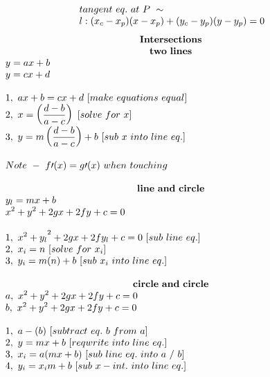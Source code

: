 \documentclass{article}
\begin{document}
\begin{multicols}{2}
\[\begin{array}{>{\displaystyle}l}
        \\
        tangent\ eq.\ at\ P\ \sim \\
        l:( x_{c} -x_{p})( x-x_{p}) +( y_{c} -y_{p})( y-y_{p}) =0
    \end{array}
    \]
    \columnbreak
    \noindent 
    \[
    \begin{array}{>{\displaystyle}l}
        \centerline{$\mathbf{Intersections\ }$}\\
        \centerline{$\mathbf{two\ lines\ }$}\\
        y=ax+b\\
        y=cx+d\\
        \\
        1,\ ax+b=cx+d\ [ make\ equations\ equal]\\
        2,\ x=\left(\frac{d-b}{a-c}\right) \ [ solve\ for\ x]\\
        3,\ y=m\left(\frac{d-b}{a-c}\right) +b\ [ sub\ x\ into\ line\ eq.]\\
        \\
        Note\ -\ f\prime ( x) =g\prime ( x)\ when\ touching\\
        \\
        \centerline{$\mathbf{line\ and\ circle\ }$}\\
        y_{l} =mx+b\\
        x^{2} +y^{2} +2gx+2fy+c=0\\
        \\
        {1,\ x^{2} +y_{l}}^{2} +2gx+2fy_{l} +c=0\ [ sub\ line\ eq.]\\
        2,\ x_{i} =n\ [ solve\ for\ x_{i}]\\
        3,\ y_{i} =m( n) +b\ [ sub\ x_{i} \ into\ line\ eq.]\\
        \\
        \centerline{$\mathbf{circle\ and\ circle\ }$}\\
        a,\ x^{2} +y^{2} +2gx+2fy+c=0\\
        b,\ x^{2} +y^{2} +2gx+2fy+c=0\\
        \\
        1,\ a-( b) \ [ subtract\ eq.\ b\ from\ a]\\
        2,\ y=mx+b\ [ reqwrite\ into\ line\ eq.]\\
        3,\ x_{i} =a( mx+b) \ [ sub\ line\ eq.\ into\ a\ /\ b]\\
        4,\ y_{i} =x_{i} m+b\ [ sub\ x-int.\ into\ line\ eq.]\\
        \\
    \end{array} 
    \]
\end{multicols}
\end{document}
